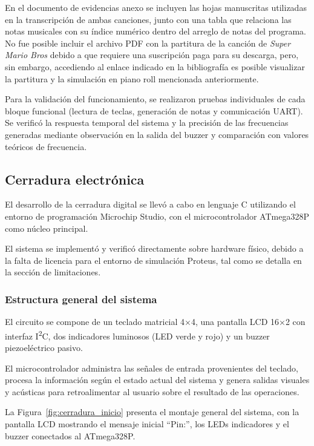 En el documento de evidencias anexo se incluyen las hojas manuscritas utilizadas en la transcripción de ambas canciones, junto con una tabla que relaciona las notas musicales con su índice numérico dentro del arreglo de notas del programa. No fue posible incluir el archivo PDF con la partitura de la canción de \textit{Super Mario Bros} debido a que requiere una suscripción paga para su descarga, pero, sin embargo, accediendo al enlace indicado en la bibliografía es posible visualizar la partitura y la simulación en piano roll mencionada anteriormente.

Para la validación del funcionamiento, se realizaron pruebas individuales de cada bloque funcional (lectura de teclas, generación de notas y comunicación UART). Se verificó la respuesta temporal del sistema y la precisión de las frecuencias generadas mediante observación en la salida del buzzer y comparación con valores teóricos de frecuencia.

\vspace{0.4cm}

\subsection{Cerradura electrónica}

El desarrollo de la cerradura digital se llevó a cabo en lenguaje C utilizando el entorno de programación Microchip Studio, 
con el microcontrolador ATmega328P como núcleo principal. 

El sistema se implementó y verificó directamente sobre hardware físico, 
debido a la falta de licencia para el entorno de simulación Proteus, tal como se detalla en la sección de limitaciones. 

\subsubsection{Estructura general del sistema}

El circuito se compone de un teclado matricial 4×4, una pantalla LCD 16×2 con interfaz I\textsuperscript{2}C, 
dos indicadores luminosos (LED verde y rojo) y un buzzer piezoeléctrico pasivo. 

El microcontrolador administra las señales de entrada provenientes del teclado, 
procesa la información según el estado actual del sistema y genera salidas visuales y acústicas 
para retroalimentar al usuario sobre el resultado de las operaciones.

La Figura~\ref{fig:cerradura_inicio} presenta el montaje general del sistema, 
con la pantalla LCD mostrando el mensaje inicial “Pin:”, los LEDs indicadores y el buzzer conectados al ATmega328P.  

